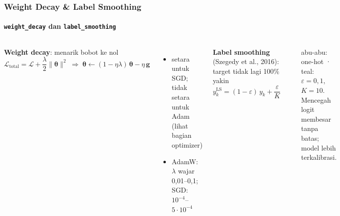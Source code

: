 \documentclass[t,aspectratio=169,xcolor={dvipsnames,table}]{beamer}
\newcommand{\con}[1]{\textcolor{dlOrange}{#1}}
\begin{document}
\begin{frame}
    \frametitle{Weight Decay \& Label Smoothing}
    \framesubtitle{\texttt{weight\_decay} dan \texttt{label\_smoothing}}
    \footnotesize

    \begin{columns}[T]
        \textbf{Weight decay}: menarik bobot ke nol
        \[
            \mathcal{L}_{\text{total}} = \mathcal{L} + \frac{\lambda}{2}\lVert\bm{\theta}\rVert^2
            \;\Rightarrow\;
            \bm{\theta} \leftarrow (1-\eta\lambda)\,\bm{\theta} - \eta\,\mathbf{g}
        \]
        \begin{itemize}
            \item setara untuk SGD; \con{tidak setara} untuk Adam (lihat bagian optimizer)
            \item AdamW: $\lambda$ wajar 0,01--0,1; SGD: $10^{-4}$--$5\cdot10^{-4}$
        \end{itemize}

        \textbf{Label smoothing} (Szegedy et al., 2016): target tidak lagi 100\% yakin
        \[
            y_k^{\text{LS}} = (1-\varepsilon)\,y_k + \frac{\varepsilon}{K}
        \]
        \begin{center}
        \end{center}
        {\scriptsize abu-abu: one-hot · teal: $\varepsilon=0{,}1$, $K=10$. Mencegah logit membesar tanpa batas; model lebih terkalibrasi.}
    \end{columns}
\end{frame}
\end{document}
